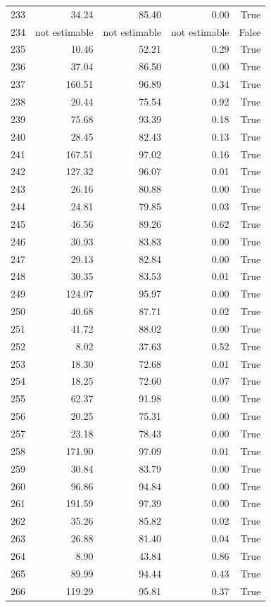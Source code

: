 \begin{longtable}{rrrrr}
233 & 34.24 & 85.40 & 0.00 & True \\
234 & not estimable & not estimable & not estimable & False \\
235 & 10.46 & 52.21 & 0.29 & True \\
236 & 37.04 & 86.50 & 0.00 & True \\
237 & 160.51 & 96.89 & 0.34 & True \\
238 & 20.44 & 75.54 & 0.92 & True \\
239 & 75.68 & 93.39 & 0.18 & True \\
240 & 28.45 & 82.43 & 0.13 & True \\
241 & 167.51 & 97.02 & 0.16 & True \\
242 & 127.32 & 96.07 & 0.01 & True \\
243 & 26.16 & 80.88 & 0.00 & True \\
244 & 24.81 & 79.85 & 0.03 & True \\
245 & 46.56 & 89.26 & 0.62 & True \\
246 & 30.93 & 83.83 & 0.00 & True \\
247 & 29.13 & 82.84 & 0.00 & True \\
248 & 30.35 & 83.53 & 0.01 & True \\
249 & 124.07 & 95.97 & 0.00 & True \\
250 & 40.68 & 87.71 & 0.02 & True \\
251 & 41.72 & 88.02 & 0.00 & True \\
252 & 8.02 & 37.63 & 0.52 & True \\
253 & 18.30 & 72.68 & 0.01 & True \\
254 & 18.25 & 72.60 & 0.07 & True \\
255 & 62.37 & 91.98 & 0.00 & True \\
256 & 20.25 & 75.31 & 0.00 & True \\
257 & 23.18 & 78.43 & 0.00 & True \\
258 & 171.90 & 97.09 & 0.01 & True \\
259 & 30.84 & 83.79 & 0.00 & True \\
260 & 96.86 & 94.84 & 0.00 & True \\
261 & 191.59 & 97.39 & 0.00 & True \\
262 & 35.26 & 85.82 & 0.02 & True \\
263 & 26.88 & 81.40 & 0.04 & True \\
264 & 8.90 & 43.84 & 0.86 & True \\
265 & 89.99 & 94.44 & 0.43 & True \\
266 & 119.29 & 95.81 & 0.37 & True \\

\end{longtable}
